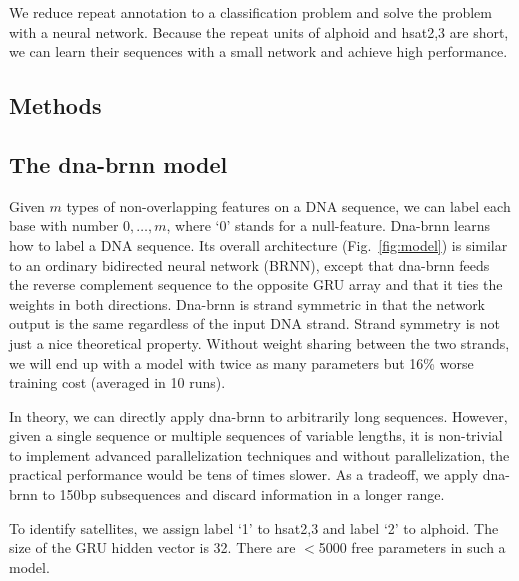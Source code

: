 \documentclass{bioinfo}
\begin{document}
We reduce repeat annotation to a classification problem and solve the problem
with a neural network. Because the repeat units of alphoid and hsat2,3 are
short, we can learn their sequences with a small network and achieve high
performance.

\begin{methods}
\section{Methods}

\subsection{The dna-brnn model}

Given $m$ types of non-overlapping features on a DNA sequence, we can label
each base with number $0,\ldots,m$, where `0' stands for a null-feature.
\mbox{Dna-brnn} learns how to label a DNA sequence. Its overall architecture
(Fig.~\ref{fig:model}) is similar to an ordinary bidirected neural network
(BRNN), except that \mbox{dna-brnn} feeds the reverse complement sequence to the
opposite GRU array and that it ties the weights in both directions. Dna-brnn is
strand symmetric in that the network output is the same regardless of the input
DNA strand. Strand symmetry is not just a nice theoretical property. Without
weight sharing between the two strands, we will end up with a model with twice
as many parameters but 16\% worse training cost (averaged in 10 runs).

In theory, we can directly apply dna-brnn to arbitrarily long sequences.
However, given a single sequence or multiple sequences of variable lengths, it
is non-trivial to implement advanced parallelization techniques and without
parallelization, the practical performance would be tens of times slower. As a
tradeoff, we apply dna-brnn to 150bp subsequences and discard information in a
longer range.

To identify satellites, we assign label `1' to hsat2,3 and label `2' to
alphoid. The size of the GRU hidden vector is 32. There are $<$5000 free
parameters in such a model.


\end{methods}
\end{document}

